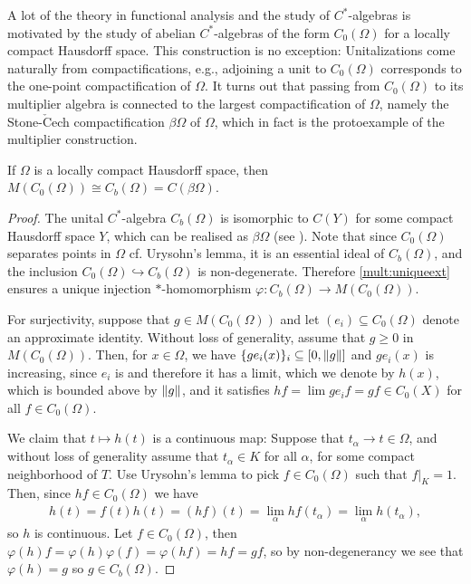 A lot of the theory in functional analysis and the study of $C^*$-algebras is motivated by the study of abelian $C^*$-algebras of the form $C_0(\Omega)$ for a locally compact Hausdorff space. This construction is no exception: Unitalizations come naturally from compactifications, e.g., adjoining a unit to $C_0(\Omega)$ corresponds to the one-point compactification of $\Omega$. It turns out that passing from $C_0(\Omega)$ to its multiplier algebra is connected to the largest compactification of $\Omega$, namely the Stone-$\mathrm{\check{C}}$ech compactification $\beta \Omega$ of $\Omega$, which in fact is the protoexample of the multiplier construction.
\begin{example}
If $\Omega$ is a locally compact Hausdorff space, then $M(C_0(\Omega))\cong C_b(\Omega) = C(\beta \Omega)$.
\end{example}
\begin{proof}
	The unital $C^*$-algebra $C_b(\Omega)$ is isomorphic to $C(Y)$ for some compact Hausdorff space $Y$, which can be realised as $\beta \Omega$ (see \cite[151]{annow}). Note that since $C_0(\Omega)$ separates points in $\Omega$ cf. Urysohn's lemma, it is an essential ideal of $C_b(\Omega)$, and the inclusion $C_0(\Omega) \hookrightarrow C_b(\Omega)$ is non-degenerate. Therefore \ref{mult:uniqueext} ensures a unique injection $*$-homomorphism $\varphi \colon C_b(\Omega) \to M(C_0(\Omega))$. 

	For surjectivity, suppose that $g \in M(C_0(\Omega))$ and let $(e_i) \subseteq C_0(\Omega)$ denote an approximate identity. Without loss of generality, assume that $g \geq 0$ in $M(C_0(\Omega))$. Then, for $x \in \Omega$, we have $\{ge_i(x)\}_i \subseteq [0,\left\lVert g \right\rVert]$ and $ge_i(x)$ is increasing, since $e_i$ is and therefore it has a limit, which we denote by $h(x)$, which is bounded above by $\left\lVert g \right\rVert$, and it satisfies $hf = \lim ge_if =  gf \in C_0(X)$ for all $f \in C_0(\Omega)$.

	We claim that $t \mapsto h(t)$ is a continuous map: Suppose that $t_\alpha \to t \in \Omega$, and without loss of generality assume that $t_\alpha \in K$ for all $\alpha$, for some compact neighborhood of $T$. Use Urysohn's lemma to pick $f \in C_0(\Omega)$ such that $f\big|_K = 1$. Then, since $h f \in C_0(\Omega)$ we have
	\begin{align*}
		h(t)=f(t) h(t) = (hf)(t) = \lim_{\alpha} hf(t_\alpha) = \lim_{\alpha}h(t_\alpha),
	\end{align*}
	so $h$ is continuous. Let $f \in C_0(\Omega)$, then $\varphi(h) f  = \varphi(h) \varphi(f) = \varphi(hf) =  hf = gf$, so by non-degenerancy we see that $\varphi(h) = g$ so $g \in C_b(\Omega)$.
\end{proof}

